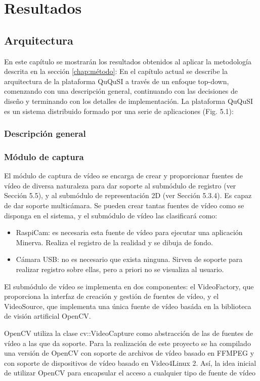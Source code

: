 \chapter{Resultados}
\label{chap:resultados}




\section{Arquitectura}
En este capítulo se mostrarán los resultados obtenidos al aplicar la metodología descrita en la sección  \ref{chap:método}: 
En el capítulo actual se describe la arquitectura de la plataforma QuQuSI a través de un
enfoque top-down, comenzando con una descripción general, continuando con las decisiones
de diseño y terminando con los detalles de implementación. La plataforma QuQuSI es un
sistema distribuido formado por una serie de aplicaciones (Fig. 5.1):


\subsection{Descripción general}
\subsection{Módulo de captura}
El módulo de captura de vídeo se encarga de crear y proporcionar fuentes de vídeo de diversa naturaleza para dar soporte al submódulo de registro (ver Sección 5.5), y al submódulo de representación 2D (ver Sección 5.3.4).
Es capaz de dar soporte multicámara. Se pueden crear tantas fuentes de vídeo como se disponga en el sistema, y el submódulo de vídeo las clasificará como: 
\begin{itemize}
\item RaspiCam: es necesaria esta fuente de vídeo para ejecutar una aplicación Minerva. Realiza el registro de la realidad y se dibuja de fondo.
\item Cámara USB: no es necesario que exista ninguna. Sirven de soporte para realizar registro sobre ellas, pero a priori no se visualiza al usuario.
\end{itemize}

El submódulo de vídeo se implementa en dos componentes: el VideoFactory, que proporciona la interfaz de creación y gestión de fuentes de vídeo, y el VideoSource, que implementa una única fuente de vídeo basáda en la biblioteca de visión artificial OpenCV.

OpenCV utiliza la clase cv::VideoCapture como abstracción de las de fuentes de vídeo a las que da soporte.
Para la realización de este proyecto se ha compilado una versión de OpenCV con soporte de archivos de vídeo basado en FFMPEG y con soporte de dispositivos de vídeo basado en Video4Linux 2. Así, la idea inicial de utilizar OpenCV para encapsular el acceso a cualquier tipo de fuente de vídeo 
